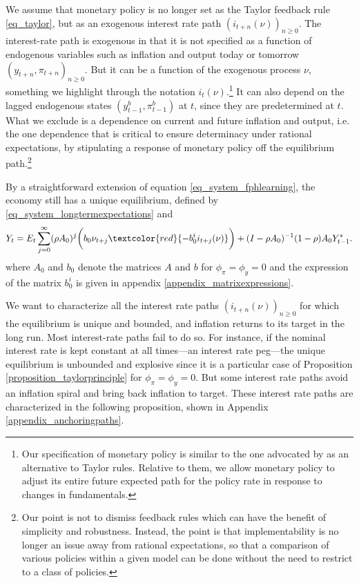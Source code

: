 \documentclass{article}
\begin{document}
We assume that monetary policy is no longer set as the Taylor feedback rule \eqref{eq_taylor}, but as an exogenous interest rate path $(i_{t+n}(\nu))_{n\geq0}$. The interest-rate path is exogenous in that it is not specified as a function of endogenous variables such as inflation and output today or tomorrow $(y_{t+n}, \pi_{t+n})_{n\geq0}$. But it can be a function of the exogenous process $\nu$, something we highlight through the notation $i_t(\nu)$.\footnote{Our specification of monetary policy is similar to the one advocated by \cite{BeaudryPortierPreston2023} as an alternative to Taylor rules. Relative to them, we allow monetary policy to adjust its entire future expected path for the policy rate in response to changes in fundamentals.} It can also depend on the lagged endogenous states $(y^b_{t-1}, \pi^b_{t-1})$ at $t$, since they are predetermined at $t$. What we exclude is a dependence on current and future inflation and output, i.e. the one dependence that is critical to ensure determinacy under rational expectations, by stipulating a response of monetary policy off the equilibrium path.\footnote{Our point is not to dismiss feedback rules which can have the benefit of simplicity and robustness. Instead, the point is that implementability is no longer an issue away from rational expectations, so that a comparison of various policies within a given model can be done without the need to restrict to a class of policies.}

By a straightforward extension of equation \eqref{eq_system_fphlearning}, the economy still has a unique equilibrium, defined by \eqref{eq_system_longtermexpectations} and
\begin{equation}
Y_t = E_t \sum_{j=0}^{\infty} (\rho A_0)^j \bigg(b_0 \nu_{t+j} \textcolor{red}{- b_0^i i_{t+j}(\nu)} \bigg) + (I-\rho A_0)^{-1} (1-\rho) A_0 Y_{t-1}^{*}.\label{eq_system_fphlearning_i}
\end{equation}
where $A_0$ and $b_0$ denote the matrices $A$ and $b$ for $\phi_{\pi}=\phi_y=0$ and the expression of the matrix $b_0^i$ is given in appendix \ref{appendix_matrixexpressions}.

We want to characterize all the interest rate paths $(i_{t+n}(\nu))_{n\geq0}$ for which the equilibrium is unique and bounded, and inflation returns to its target in the long run. Most interest-rate paths fail to do so. For instance, if the nominal interest rate is kept constant at all times---an interest rate peg---the unique equilibrium is unbounded and explosive since it is a particular case of Proposition \ref{proposition_taylorprinciple} for $\phi_{\pi}=\phi_y=0$. But some interest rate paths avoid an inflation spiral and bring back inflation to target. These interest rate paths are characterized in the following proposition, shown in Appendix \ref{appendix_anchoringpaths}.
\end{document}
